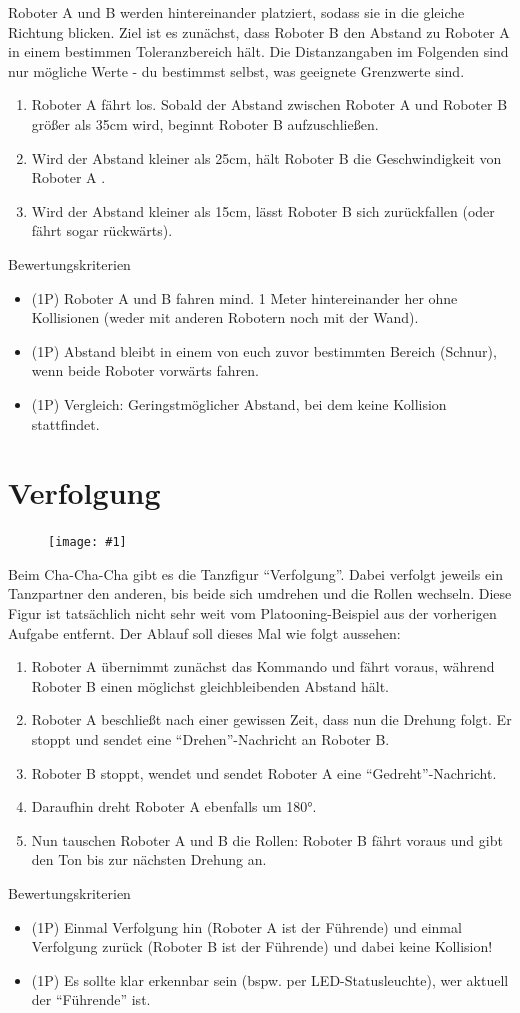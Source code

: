 \documentclass[
	12pt,
	article,
	type=bsc, %
	colorbacktitle,
	instlogo,
	accentcolor=tud1c,
	german,
	twoside
]{tudexercise}
\newcommand{\easygcenter}[1]{
	\begin{figure}[h]
	\centering 
	\texttt{[image: \#1]}
	\end{figure}
}
\begin{document}
Roboter A und B werden hintereinander platziert, sodass sie in die gleiche Richtung blicken. Ziel ist es zunächst, dass Roboter B den Abstand zu Roboter A in einem bestimmen Toleranzbereich hält. Die Distanzangaben im Folgenden sind nur mögliche Werte - du bestimmst selbst, was geeignete Grenzwerte sind.
\begin{enumerate}
\item Roboter A fährt los. Sobald der Abstand zwischen Roboter A und Roboter B größer als 35cm wird, beginnt Roboter B aufzuschließen.
\item Wird der Abstand kleiner als 25cm, hält Roboter B die Geschwindigkeit von Roboter A .
\item Wird der Abstand kleiner als 15cm, lässt Roboter B sich zurückfallen (oder fährt sogar rückwärts).
\end{enumerate}
Bewertungskriterien
\begin{itemize}
\item (1P) Roboter A und B fahren mind. 1 Meter hintereinander her ohne Kollisionen (weder mit anderen Robotern noch mit der Wand).
\item (1P) Abstand bleibt in einem von euch zuvor bestimmten Bereich (Schnur), wenn beide Roboter vorwärts fahren.
\item (1P) Vergleich: Geringstmöglicher Abstand, bei dem keine Kollision stattfindet.
\end{itemize}

\newpage
\section{Verfolgung}
\easygcenter{img/chachacha.png}
Beim Cha-Cha-Cha gibt es die Tanzfigur “Verfolgung”. Dabei verfolgt jeweils ein Tanzpartner den anderen, bis beide sich umdrehen und die Rollen wechseln. Diese Figur ist tatsächlich nicht sehr weit vom Platooning-Beispiel aus der vorherigen Aufgabe entfernt.
Der Ablauf soll dieses Mal wie folgt aussehen:
\begin{enumerate}
\item  Roboter A übernimmt zunächst das Kommando und fährt voraus, während Roboter B einen möglichst gleichbleibenden Abstand hält.
\item  Roboter A beschließt nach einer gewissen Zeit, dass nun die Drehung folgt. Er stoppt und sendet eine “Drehen”-Nachricht an Roboter B.
\item  Roboter B stoppt, wendet und sendet Roboter A eine “Gedreht”-Nachricht.
\item  Daraufhin dreht Roboter A ebenfalls um 180°.
\item  Nun tauschen Roboter A und B die Rollen: Roboter B fährt voraus und gibt den Ton bis zur nächsten Drehung an.
\end{enumerate}
Bewertungskriterien
\begin{itemize}
\item (1P) Einmal Verfolgung hin (Roboter A ist der Führende) und einmal Verfolgung zurück (Roboter B ist der Führende) und dabei keine Kollision!
\item (1P) Es sollte klar erkennbar sein (bspw. per LED-Statusleuchte), wer aktuell der “Führende” ist.
\end{itemize}
\end{document}

